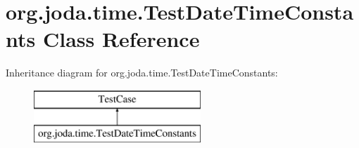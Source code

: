 \hypertarget{classorg_1_1joda_1_1time_1_1_test_date_time_constants}{\section{org.\-joda.\-time.\-Test\-Date\-Time\-Constants Class Reference}
\label{classorg_1_1joda_1_1time_1_1_test_date_time_constants}
}
Inheritance diagram for org.\-joda.\-time.\-Test\-Date\-Time\-Constants\-:\begin{figure}[H]
\begin{center}
\leavevmode
\includegraphics[height=2.000000cm]{classorg_1_1joda_1_1time_1_1_test_date_time_constants}
\end{center}
\end{figure}
